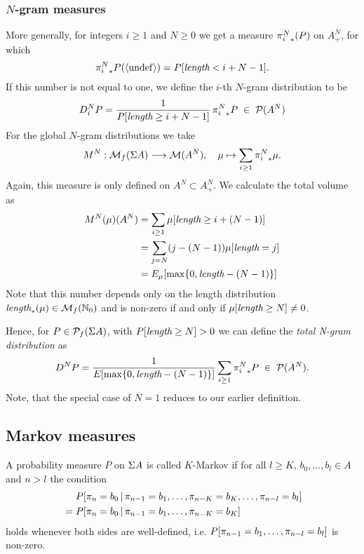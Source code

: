 \documentclass[11pt]{article}
\begin{document}

\subsubsection{$N$-gram measures}

More generally, for integers $i \geq 1$ and $N \geq 0$ we get a
measure ${\pi_{i}^{N}}_*(P)$ on $A^N_+$, for which
\[ {\pi_{i}^{N}}_* P (\langle \mathrm{undef} \rangle) =  P[\text{\it length} < i + N -1]. \]
If this number is not equal to one, we define the $i$-th $N$-gram
distribution to be
\[ D_i^N P = \frac{1}{P[\text{\it length} \geq i+N-1]} \, 
             {\pi_{i}^{N}}_* P \;\in\; \mathcal{P}(A^N) \]
For the global $N$-gram distributions we take
\[ M^N: \mathcal{M}_f(\Sigma A) \longrightarrow \mathcal{M}(A^N), \quad \mu \mapsto \sum_{i
\geq 1} {\pi_{i}^{N}}_* \mu. \]
Again, this measure is only defined on $A^N \subset A^N_+$.
We calculate the total volume as
\begin{align} 
  M^N(\mu)(A^N) &= \sum_{i \geq 1} \mu[\text{\it length} \geq i + (N-1)] \\
                &= \sum_{j = N} (j-(N-1)) \mu[\text{\it length} = j]    \\
                &= E_{\mu}[\max\{ 0, \text{\it length} - (N-1) \} ]  
\end{align}
Note that this number depends only on the length distribution
$\text{\it length}_*(\mu) \in \mathcal{M}_f({\mathbb N}_0)$ and is non-zero if and only if
$\mu[\text{\it length} \geq N] \neq 0$. 

Hence, for $P \in \mathcal{P}_f(\Sigma A)$, with $P[\text{\it length} \geq N] > 0$ we can define the
{\it total N-gram distribution} as
\[ D^N P = \frac{1}{E_{}[\max\{ 0, \text{\it length} - (N-1) \} ]}
           \sum_{i \geq 1} {\pi_{i}^{N}}_* P \;\in\; \mathcal{P}(A^N). \]
Note, that the special case of $N=1$ reduces to our earlier definition.

\subsection{Markov measures}

A probability measure $P$ on $\Sigma A$ is called $K$-Markov if
for all $l \geq K$, $b_0,\dots,b_l \in A$ and $n > l$ the condition
\begin{align*}
  &  P[ {\pi_{n}} = b_0 \,|\, {\pi_{n-1}} = b_1, \dots, {\pi_{n-K}} = b_K, \dots, {\pi_{n-l}} = b_l ] \\  
 \;=\;&  P[ {\pi_{n}} = b_0 \,|\, {\pi_{n-1}} = b_1, \dots, {\pi_{n-K}} = b_K ]
\end{align*}
holds whenever both sides are well-defined, i.e.
$P[{\pi_{n-1}} = b_1,\dots, {\pi_{n-l}} = b_l ]$ is non-zero.
\end{document}
